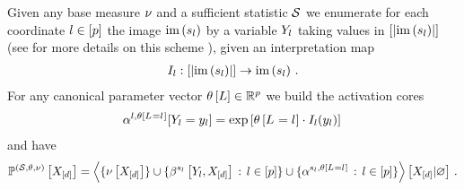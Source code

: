 \begin{theorem}
    \label{the:expFamilyTensorRep}
    Given any base measure $\nu$ and a sufficient statistic $\mathcal{S}$ we enumerate for each coordinate $l\in[p]$ the image $\mathrm{im}\left(s_{l}\right)$ by a variable $Y_{l}$ taking values in $[\left|\mathrm{im}\left(s_{l}\right)\right|]$ (see for more details on this scheme ), given an interpretation map
    \begin{align*}
        I_{l} :
        [\left|\mathrm{im}\left(s_{l}\right)\right|] \rightarrow \mathrm{im}\left(s_{l}\right) \, .
    \end{align*}
    For any canonical parameter vector $\theta\left[L\right]\in\mathbb{R}^{p}$ we build the activation cores
    \begin{align*}
        \alpha^{l,\theta\left[L_{}=l_{}\right]}[Y_{l}=y_{l}]
        = \mathrm{exp}\left[\theta\left[L_{}=l_{}\right] \cdot I_{l}(y_{l}) \right] \,
    \end{align*}
    and have
    \begin{align*}
        \mathbb{P}^{(\mathcal{S},\theta,\nu)}\left[X_{[d]}\right] =
        \left\langle \{\nu\left[X_{[d]}\right]\} \cup \{\beta^{s_{l}}\left[Y_{l},X_{[d]}\right] \,:\, l\in[p]\}\cup\{\alpha^{s_{l},\theta\left[L_{}=l_{}\right]} \,:\, l\in[p]\}\right\rangle \left[ X_{[d]} | \varnothing \right] \, .
    \end{align*}
\end{theorem}
